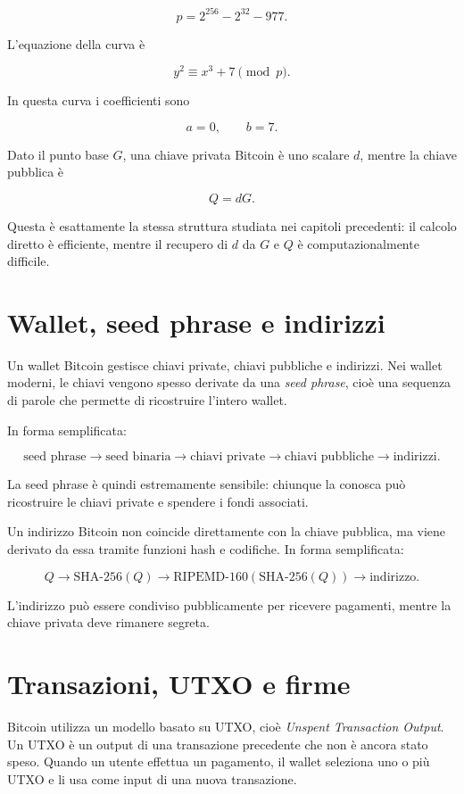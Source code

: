 \documentclass[12pt,a4paper,oneside]{report}
\begin{document}
\[
p = 2^{256} - 2^{32} - 977.
\]

L'equazione della curva è

\[
y^2 \equiv x^3 + 7 \pmod p.
\]

In questa curva i coefficienti sono

\[
a=0, \qquad b=7.
\]

Dato il punto base \(G\), una chiave privata Bitcoin è uno scalare \(d\), mentre la chiave pubblica è

\[
Q=dG.
\]

Questa è esattamente la stessa struttura studiata nei capitoli precedenti: il calcolo diretto è efficiente, mentre il recupero di \(d\) da \(G\) e \(Q\) è computazionalmente difficile.

\section{Wallet, seed phrase e indirizzi}

Un wallet Bitcoin gestisce chiavi private, chiavi pubbliche e indirizzi. Nei wallet moderni, le chiavi vengono spesso derivate da una \textit{seed phrase}, cioè una sequenza di parole che permette di ricostruire l'intero wallet.

In forma semplificata:

\[
\text{seed phrase}
\longrightarrow
\text{seed binaria}
\longrightarrow
\text{chiavi private}
\longrightarrow
\text{chiavi pubbliche}
\longrightarrow
\text{indirizzi}.
\]

La seed phrase è quindi estremamente sensibile: chiunque la conosca può ricostruire le chiavi private e spendere i fondi associati.

Un indirizzo Bitcoin non coincide direttamente con la chiave pubblica, ma viene derivato da essa tramite funzioni hash e codifiche. In forma semplificata:

\[
Q
\longrightarrow
\mathrm{SHA\mbox{-}256}(Q)
\longrightarrow
\mathrm{RIPEMD\mbox{-}160}(\mathrm{SHA\mbox{-}256}(Q))
\longrightarrow
\text{indirizzo}.
\]

L'indirizzo può essere condiviso pubblicamente per ricevere pagamenti, mentre la chiave privata deve rimanere segreta.

\section{Transazioni, UTXO e firme}

Bitcoin utilizza un modello basato su UTXO, cioè \textit{Unspent Transaction Output}. Un UTXO è un output di una transazione precedente che non è ancora stato speso. Quando un utente effettua un pagamento, il wallet seleziona uno o più UTXO e li usa come input di una nuova transazione.
\end{document}
